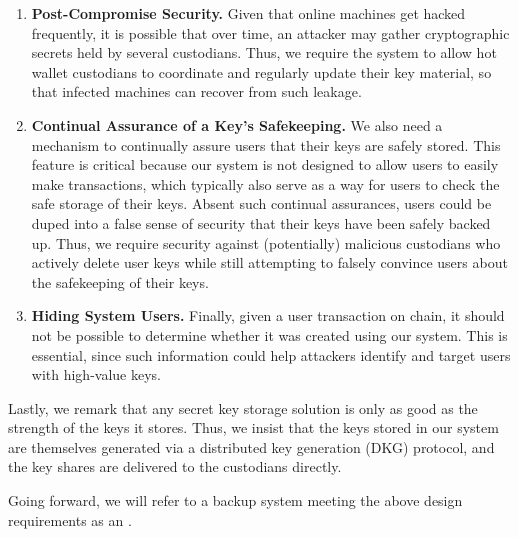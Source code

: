 \begin{enumerate}
\item \textbf{Post-Compromise Security.} Given that online machines get hacked frequently, it is possible that over time, an attacker may gather cryptographic secrets held by several custodians. Thus, we require the system to allow hot wallet custodians to coordinate and regularly update their key material, so that infected machines can recover from such leakage.

\item \textbf{Continual Assurance of a Key's Safekeeping.} We also need a mechanism to continually assure users that their keys are safely stored. This feature is critical because our system is not designed to allow users to easily make transactions, which typically also serve as a way for users to check the safe storage of their keys. Absent such continual assurances, users could be duped into a false sense of security that their keys have been safely backed up. Thus, we require security against (potentially) malicious custodians who actively delete user keys while still attempting to falsely convince users about the safekeeping of their keys. 

\item \textbf{Hiding System Users.} Finally, given a user transaction on chain, it should not be possible to determine whether it was created using our system. This is essential, since such information could help attackers identify and target users with high-value keys. 
\end{enumerate}

Lastly, we remark that any secret key storage solution is only as good as the strength of the keys it stores. Thus, we insist that the keys stored in our system are themselves generated via a distributed key generation (DKG) protocol, and the key shares are delivered to the custodians directly.%

Going forward, we will refer to a backup system meeting the above design requirements as an \emph{\hcwl}.